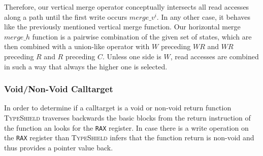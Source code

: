 Therefore, our vertical merge operator conceptually intersects all read accesses along a path until the first write 
occurs $merge\_v^{i}$. In any other case, it behaves like the previously mentioned vertical merge function.
Our horizontal merge $merge\_h$ function is a pairwise combination of the given set of states, which are then combined with a union-like operator 
with $W$ preceding $WR$ and $WR$ preceding $R$ and $R$ preceding $C$. Unless one side is $W$, read accesses are combined in such a way that always the higher one is selected.

%

\subsubsection{Void/Non-Void Calltarget}
In order to determine if a calltarget is a void or non-void return function
\textsc{TypeShield} traverses backwards the basic blocks from the return instruction of the function an looks for the \texttt{RAX} register.
In case  there is a write operation on the \texttt{RAX} register than \textsc{TypeShield}
infers that the function return is non-void and thus provides a pointer value back.

